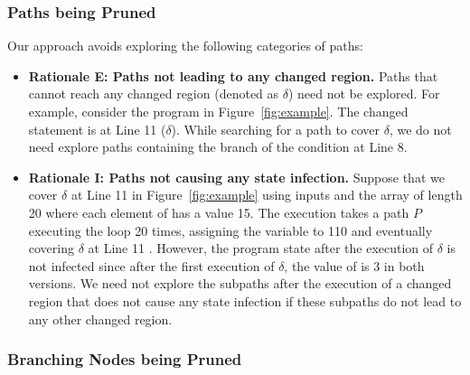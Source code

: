  \subsubsection{Paths being Pruned}
 Our approach avoids exploring the following categories of paths:
\begin{itemize}
\item \textbf{Rationale E: Paths not leading to any changed region.} Paths that cannot reach any changed region (denoted as $\delta$) need not be 
explored. For example, consider the  program in Figure~\ref{fig:example}.
 The changed statement is at Line 11 ($\delta$). While searching for a path 
 to cover $\delta$, we do not need explore paths containing the  branch of the condition at Line 8. 
\item \textbf{Rationale I: Paths not causing any state infection.} Suppose that we cover $\delta$ at Line 11 
in Figure~\ref{fig:example} using inputs  and the array  of length 20 where each element of  has a value 15. The execution takes a path $P$ 
executing the loop 20 times, assigning the variable  to 110 and eventually 
covering $\delta$ at Line 11 . However, the program state after the execution of $\delta$ is not infected since 
after the first execution of $\delta$, the value of  is 3 in both versions. We need not explore the subpaths after the execution of a changed region that does not cause any state infection if these subpaths do not lead to any other changed region.
\end{itemize}

\subsubsection{Branching Nodes being Pruned}

